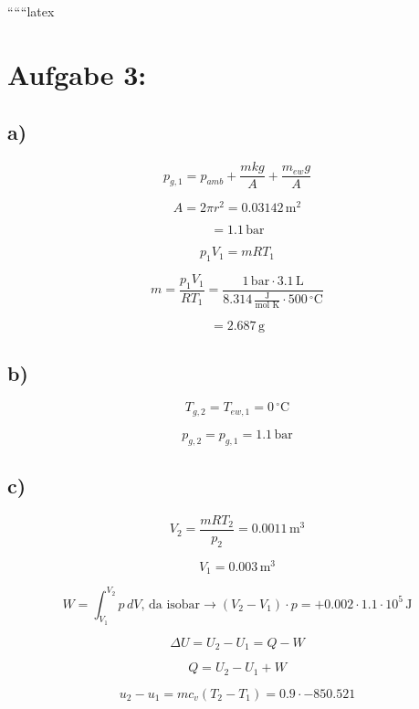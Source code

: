 
``````latex


\section*{Aufgabe 3:}

\subsection*{a)}

\[
p_{g,1} = p_{amb} + \frac{m k g}{A} + \frac{m_{ew} g}{A}
\]

\[
A = 2 \pi r^2 = 0.03142 \, \text{m}^2
\]

\[
= 1.1 \, \text{bar}
\]

\[
p_1 V_1 = m R T_1
\]

\[
m = \frac{p_1 V_1}{R T_1} = \frac{1 \, \text{bar} \cdot 3.1 \, \text{L}}{8.314 \, \frac{\text{J}}{\text{mol K}} \cdot 500 \, ^\circ \text{C}}
\]

\[
= 2.687 \, \text{g}
\]

\subsection*{b)}

\[
T_{g,2} = T_{ew,1} = 0 \, ^\circ \text{C}
\]


\[
p_{g,2} = p_{g,1} = 1.1 \, \text{bar}
\]


\subsection*{c)}

\[
V_2 = \frac{m R T_2}{p_2} = 0.0011 \, \text{m}^3
\]

\[
V_1 = 0.003 \, \text{m}^3
\]

\[
W = \int_{V_1}^{V_2} p \, dV, \, \text{da isobar} \rightarrow (V_2 - V_1) \cdot p = +0.002 \cdot 1.1 \cdot 10^5 \, \text{J}
\]

\[
\Delta U = U_2 - U_1 = Q - W
\]

\[
Q = U_2 - U_1 + W
\]

\[
u_2 - u_1 = m c_v (T_2 - T_1) = 0.9 \cdot -850.521
\]


